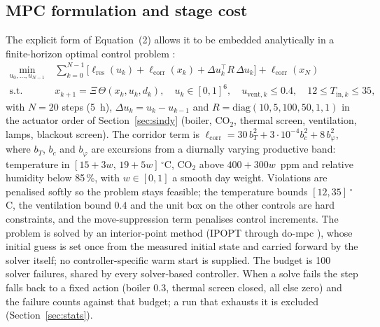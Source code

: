 \subsection{MPC formulation and stage cost}
\label{sec:mpc}

The explicit form of Equation~(2) allows it to be embedded analytically in a
finite-horizon optimal control problem \cite{mayne2000}:
%
\begin{equation}
\begin{aligned}
\min_{u_{0},\dots,u_{N-1}}\ &\sum_{k=0}^{N-1}\bigl[\ell_{\mathrm{res}}(u_k)
+\ell_{\mathrm{corr}}(x_k)+\Delta u_k^{\top}R\,\Delta u_k\bigr]+\ell_{\mathrm{corr}}(x_N)\\
\text{s.t.}\quad & x_{k+1}=\Xi\,\Theta(x_k,u_k,d_k),\quad
u_k\in[0,1]^6,\quad u_{\mathrm{vent},k}\le 0.4,\quad 12\le T_{\mathrm{in},k}\le 35,
\end{aligned}
\label{eq:mpc}
\end{equation}
%
with $N=20$ steps (5~h), $\Delta u_k=u_k-u_{k-1}$ and $R=\mathrm{diag}(10,5,100,50,1,1)$
in the actuator order of Section~\ref{sec:sindy} (boiler, CO$_2$, thermal screen,
ventilation, lamps, blackout screen). The corridor term is
$\ell_{\mathrm{corr}}=30\,b_T^2+3\cdot10^{-4}b_{c}^2+8\,b_{\varphi}^2$, where $b_T$,
$b_c$ and $b_\varphi$ are excursions from a diurnally varying productive band:
temperature in $[15+3w,\,19+5w]\,^\circ$C, CO$_2$ above $400+300w$~ppm and relative
humidity below 85\,\%, with $w\in[0,1]$ a smooth day weight. Violations are penalised
softly so the problem stays feasible; the temperature bounds $[12,35]\,^\circ$C, the
ventilation bound $0.4$ and the unit box on the other controls are hard constraints, and
the move-suppression term penalises control increments. The problem is solved by an
interior-point method (IPOPT \cite{wachter2006} through do-mpc \cite{fiedler2023}), whose
initial guess is set once from the measured initial state and carried forward by the
solver itself; no controller-specific warm start is supplied. The budget is 100 solver
failures, shared by every solver-based
controller. When a solve fails the step falls back to a fixed action (boiler 0.3, thermal
screen closed, all else zero) and the failure counts against that budget; a run that
exhausts it is excluded (Section~\ref{sec:stats}).

